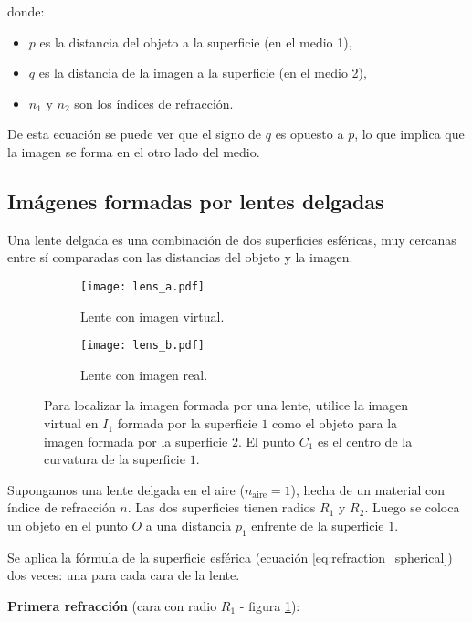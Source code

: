 \noindent donde:
\begin{itemize}
  \item \(p\) es la distancia del objeto a la superficie (en el medio 1),
  \item \(q\) es la distancia de la imagen a la superficie (en el medio 2),
  \item \(n_1\) y \(n_2\) son los índices de refracción.
\end{itemize}

De esta ecuación se puede ver que el signo de \(q\) es opuesto a \(p\), lo que implica que la imagen se forma en el otro lado del medio.

\subsection{Imágenes formadas por lentes delgadas}

Una lente delgada es una combinación de dos superficies esféricas, muy cercanas entre sí comparadas con las distancias del objeto y la imagen.
\begin{figure}[ht]
  \centering
  \begin{subfigure}[b]{0.45\textwidth}
      \centering
      \texttt{[image: lens\_a.pdf]}
      \caption{Lente con imagen virtual.}
      \label{fig:lens_a}
  \end{subfigure}
  \hfill
  \begin{subfigure}[b]{0.45\textwidth}
      \centering
      \texttt{[image: lens\_b.pdf]}
      \caption{Lente con imagen real.}
      \label{fig:lens_b}
  \end{subfigure}
  \caption{Para localizar la imagen formada por una lente, utilice la imagen virtual en \(I_1\) formada por la superficie \(1\) como el objeto para la imagen formada por la superficie \(2\). El punto \(C_1\) es el centro de la curvatura de la superficie \(1\).}
  \label{fig:lenses}
\end{figure}

Supongamos una lente delgada en el aire (\(n_{\text{aire}} = 1\)), hecha de un material con índice de refracción \(n\). Las dos superficies tienen radios \(R_1\) y \(R_2\). Luego se coloca un objeto en el punto \(O\) a una distancia \(p_1\) enfrente de la superficie \(1\).

Se aplica la fórmula de la superficie esférica (ecuación \ref{eq:refraction_spherical}) dos veces: una para cada cara de la lente.

\textbf{Primera refracción} (cara con radio \(R_1\) - figura \ref{fig:lens_a}):


